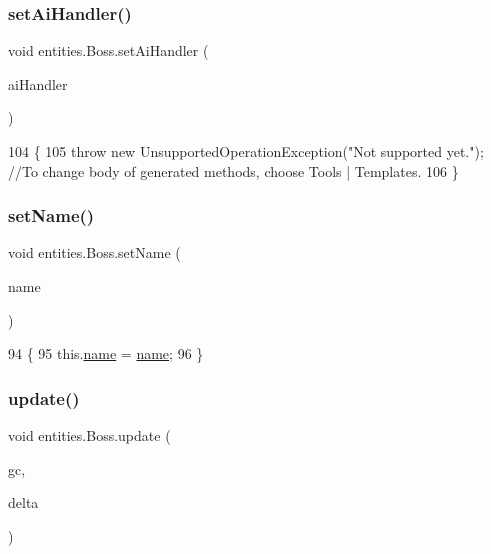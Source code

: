 \subsubsection{\texorpdfstring{set\+Ai\+Handler()}{setAiHandler()}}
{\footnotesize\ttfamily void entities.\+Boss.\+set\+Ai\+Handler (\begin{DoxyParamCaption}\item[{\mbox{\hyperlink{classentities_1_1_a_i_handler_basic}{A\+I\+Handler\+Basic}}}]{ai\+Handler }\end{DoxyParamCaption})\hspace{0.3cm}{\ttfamily [inline]}}


\begin{DoxyCode}
104                                                        \{
105         \textcolor{keywordflow}{throw} \textcolor{keyword}{new} UnsupportedOperationException(\textcolor{stringliteral}{"Not supported yet."}); \textcolor{comment}{//To change body of generated
       methods, choose Tools | Templates.}
106     \}
\end{DoxyCode}
\mbox{\label{classentities_1_1_boss_a75f4332245981e1b51ea1b42028561cf}} 
\subsubsection{\texorpdfstring{set\+Name()}{setName()}}
{\footnotesize\ttfamily void entities.\+Boss.\+set\+Name (\begin{DoxyParamCaption}\item[{String}]{name }\end{DoxyParamCaption})\hspace{0.3cm}{\ttfamily [inline]}}


\begin{DoxyCode}
94                                      \{
95         this.\mbox{\hyperlink{classentities_1_1_boss_a859a82dc20d22942934fb9f508b87310}{name}} = \mbox{\hyperlink{classentities_1_1_boss_a859a82dc20d22942934fb9f508b87310}{name}};
96     \}
\end{DoxyCode}
\mbox{\label{classentities_1_1_boss_a4571ec7a8c673adccf47b7271a55f1e8}} 
\subsubsection{\texorpdfstring{update()}{update()}}
{\footnotesize\ttfamily void entities.\+Boss.\+update (\begin{DoxyParamCaption}\item[{\mbox{\hyperlink{classorg_1_1newdawn_1_1slick_1_1_game_container}{Game\+Container}}}]{gc,  }\item[{long}]{delta }\end{DoxyParamCaption})\hspace{0.3cm}{\ttfamily [inline]}}


